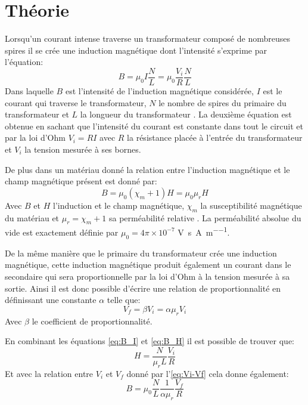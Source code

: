 \section{Théorie}

Lorsqu'un courant intense traverse un transformateur composé de nombreuses spires il se crée une induction magnétique dont l'intensité s'exprime par l'équation:
\begin{equation}
    B = \mu_0 I \frac{N}{L} = \mu_0 \frac{V_i}{R} \frac{N}{L}
    \label{eq:B_I}
\end{equation}
Dans laquelle \(B\) est l'intensité de l'induction magnétique considérée, \(I\) est le courant qui traverse le transformateur, \(N\) le nombre de spires du primaire du transformateur et \(L\) la longueur du transformateur \cite{assistant}. La deuxième équation est obtenue en sachant que l'intensité du courant est constante dans tout le circuit et par la loi d'Ohm \(V_i = RI\) avec \(R\) la résistance placée à l'entrée du transformateur et \(V_i\) la tension mesurée à ses bornes.

De plus dans un matériau donné la relation entre l'induction magnétique et le champ magnétique présent est donné par:
\begin{equation}
    B = \mu_0 (\chi_m + 1) H = \mu_0 \mu_r H
    \label{eq:B_H}
\end{equation}
Avec \(B\) et \(H\) l'induction et le champ magnétique, \(\chi_m\) la susceptibilité magnétique du matériau et \(\mu_r = \chi_m + 1\) sa perméabilité relative \cite{notice}. La perméabilité absolue du vide est exactement définie par \(\mu_0 = 4\pi \times 10^{-7}\) \si{\volt\second \per\ampere\per\meter}.

De la même manière que le primaire du transformateur crée une induction magnétique, cette induction magnétique produit également un courant dans le secondaire qui sera proportionnelle par la loi d'Ohm à la tension mesurée à sa sortie. Ainsi il est donc possible d'écrire une relation de proportionnalité en définissant une constante \(\alpha\) telle que:
\begin{equation}
    V_f = \beta V_i = \alpha \mu_r V_i
    \label{eq:Vi-Vf}
\end{equation}
Avec \(\beta\) le coefficient de proportionnalité.

En combinant les équations \autoref{eq:B_I} et \autoref{eq:B_H} il est possible de trouver que:
\begin{equation}
    H = \frac{N}{\mu_r L} \frac{V_i}{R}
    \label{eq:calibr_H}
\end{equation}
Et avec la relation entre \(V_i\) et \(V_f\) donné par l'\autoref{eq:Vi-Vf} cela donne également:
\begin{equation}
    B = \mu_0 \frac{N}{L} \frac{1}{\alpha \mu_r} \frac{V_f}{R}
    \label{eq:calibr_B}
\end{equation}

